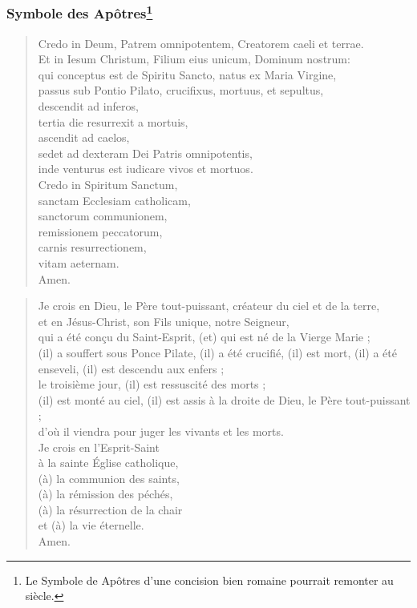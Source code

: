 \subsubsection*{Symbole des Apôtres\footnote{Le Symbole de Apôtres d’une concision bien romaine pourrait remonter au  siècle. }}

{\bf
\begin{minipage}[t]{0.5\textwidth}
\begin{verse}
Credo in Deum, Patrem omnipotentem, Creatorem caeli et terrae.\\
Et in Iesum Christum, Filium eius unicum, Dominum nostrum:\\
qui conceptus est de Spiritu Sancto, natus ex Maria Virgine,\\
passus sub Pontio Pilato, crucifixus, mortuus, et sepultus,\\
descendit ad inferos,\\
tertia die resurrexit a mortuis,\\
ascendit ad caelos,\\
sedet ad dexteram Dei Patris omnipotentis,\\
inde venturus est iudicare vivos et mortuos.\\
Credo in Spiritum Sanctum,\\
sanctam Ecclesiam catholicam,\\
sanctorum communionem,\\
remissionem peccatorum,\\
carnis resurrectionem,\\
vitam aeternam.\\
Amen.
\end{verse}
\end{minipage}
\begin{minipage}[t]{0.5\textwidth}
\begin{verse}
Je crois en Dieu, le Père tout-puissant, créateur du ciel et de la terre, \\
et en Jésus-Christ, son Fils unique, notre Seigneur, \\
qui a été conçu du Saint-Esprit, (et) qui est né de la Vierge Marie ; \\
(il) a souffert sous Ponce Pilate, (il) a été crucifié, (il) est mort, (il) a été enseveli, (il) est descendu aux enfers ;\\
le troisième jour, (il) est ressuscité des morts ;\\
(il) est monté au ciel, (il) est assis à la droite de Dieu, le Père tout-puissant ; \\
d'où il viendra pour juger les vivants et les morts. \\
Je crois en l'Esprit-Saint \\
à la sainte Église catholique, \\
(à) la communion des saints, \\
(à) la rémission des péchés, \\
(à) la résurrection de la chair \\
et (à) la vie éternelle. \\
Amen.
\end{verse}
\end{minipage}
}




